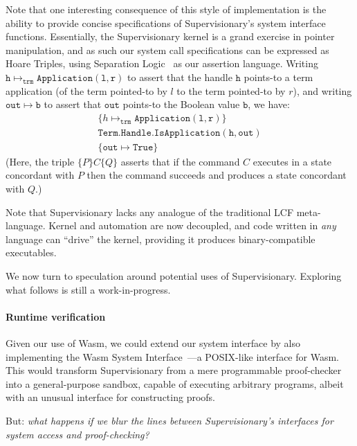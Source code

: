 \documentclass[sigplan, review]{acmart}
\begin{document}
Note that one interesting consequence of this style of implementation is the ability to provide concise specifications of Supervisionary's system interface functions.
Essentially, the Supervisionary kernel is a grand exercise in pointer manipulation, and as such our system call specifications can be expressed as Hoare Triples, using Separation Logic~\cite{DBLP:conf/lics/Reynolds02} as our assertion language.
Writing $\mathtt{h} \mapsto_{\mathtt{trm}} \mathtt{Application(l, r)}$ to assert that the handle $\mathtt{h}$ points-to a term application (of the term pointed-to by $l$ to the term pointed-to by $r$), and writing $\mathtt{out} \mapsto \mathtt{b}$ to assert that $\mathtt{out}$ points-to the Boolean value $\mathtt{b}$, we have:
\begin{gather*}
\{ h \mapsto_{\mathtt{trm}} \mathtt{Application(l, r)} \} \\
\mathtt{Term.Handle.IsApplication(h, out)} \\
\{ \mathtt{out} \mapsto \mathtt{True} \}
\end{gather*}
(Here, the triple $\{ P \} C \{ Q \}$ asserts that if the command $C$ executes in a state concordant with $P$ then the command succeeds and produces a state concordant with $Q$.)

Note that Supervisionary lacks any analogue of the traditional LCF meta-language.
Kernel and automation are now decoupled, and code written in \emph{any} language can ``drive'' the kernel, providing it produces binary-compatible executables.

\vspace{\baselineskip}
We now turn to speculation around potential uses of Supervisionary.
Exploring what follows is still a work-in-progress.
\paragraph{Runtime verification}

Given our use of Wasm, we could extend our system interface by also implementing the Wasm System Interface~\cite{Wasi}---a POSIX-like interface for Wasm.
This would transform Supervisionary from a mere programmable proof-checker into a general-purpose sandbox, capable of executing arbitrary programs, albeit with an unusual interface for constructing proofs.

\vspace{\baselineskip}
But: \emph{what happens if we blur the lines between Supervisionary's interfaces for system access and proof-checking?}
\vspace{\baselineskip}
\end{document}
